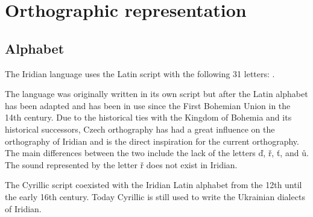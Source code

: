 \section{Orthographic representation}\label{sec:ortho}
\subsection{Alphabet}

\par The Iridian language uses the Latin script with the following 31 letters:
.

The language was originally written in its own script but after the Latin
alphabet has been adapted and has been in use since the First Bohemian Union in
the 14th century. Due to the historical ties with the Kingdom of Bohemia and its
historical successors, Czech orthography has had a great influence on the
orthography of Iridian and is the direct inspiration for the current
orthography. The main differences between the two include the lack of the
letters \v{d}, \v{r}, \v{t}, and ů. The sound represented by the letter
\v{r} does not exist in Iridian.

The Cyrillic script coexisted with the Iridian Latin alphabet from the 12th
until the early 16th century. Today Cyrillic is still used to write the
Ukrainian dialects of Iridian.


